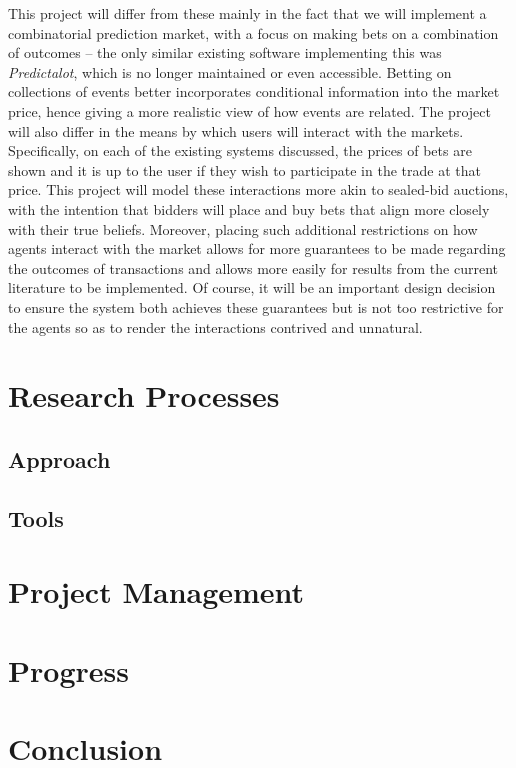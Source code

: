 \documentclass[10pt,a4paper]{article}
\theoremstyle{plain}
\theoremstyle{definition}
\begin{document}
	This project will differ from these mainly in the fact that we will
	implement a combinatorial prediction market, with a focus on making bets on
	a combination of outcomes -- the only similar existing software
	implementing this was \emph{Predictalot}, which is no longer maintained or
	even accessible. Betting on collections of events better incorporates
	conditional information into the market price, hence giving a more
	realistic view of how events are related. The project will also differ in
	the means by which users will interact with the markets. Specifically, on
	each of the existing systems discussed, the prices of bets are shown and it
	is up to the user if they wish to participate in the trade at that price.
	This project will model these interactions more akin to sealed-bid
	auctions, with the intention that bidders will place and buy bets that
	align more closely with their true beliefs. Moreover, placing such
	additional restrictions on how agents interact with the market allows for
	more guarantees to be made regarding the outcomes of transactions and
	allows more easily for results from the current literature to be
	implemented. Of course, it will be an important design decision to ensure
	the system both achieves these guarantees but is not too restrictive for
	the agents so as to render the interactions contrived and unnatural.

\section{Research Processes}
	\label{sec:researchProcesses}

	\subsection{Approach}

	\subsection{Tools}

\section{Project Management}
	\label{sec:projectManagement}

\section{Progress}
	\label{sec:progress}

\section{Conclusion}
	\label{sec:conclusion}


\end{document}
